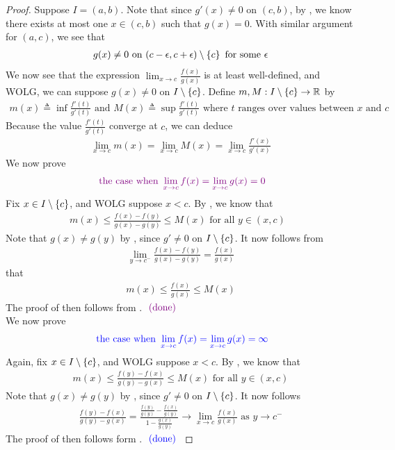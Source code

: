 \documentclass{report}
\begin{document}
\begin{proof}
Suppose $I=(a,b)$. Note that since $g'(x)\neq 0$ on $(c,b)$, by  , we know there exists at most one $x \in (c,b)$ such that $g(x)=0$. With similar argument for $(a,c)$, we see that 
\begin{align*}
g(x)\neq 0\text{ on }(c-\epsilon ,c+\epsilon )\setminus \left\{ c \right\}\text{ for some }\epsilon 
\end{align*}
We now see that the expression $\lim_{x\to c}\frac{f(x)}{g(x)}$ is at least well-defined, and WOLG, we can suppose $g(x)\neq 0$ on $I \setminus \left\{ c \right\}$. Define $m,M:I\setminus \left\{ c \right\}\rightarrow \mathbb{R}$ by 
\begin{align*}
m(x)\triangleq \inf \frac{f'(t)}{g'(t)}\text{ and }M(x)\triangleq \sup \frac{f'(t)}{g'(t)}\text{ where }t\text{ ranges over values between $x$ and  $c$ }
\end{align*}
Because the value $\frac{f'(t)}{g'(t)}$ converge at $c$, we can deduce
 \begin{align}
  \label{sq1}
\lim_{x\to c}m(x)=\lim_{x\to c}M(x)=\lim_{x\to c} \frac{f'(x)}{g'(x)}
\end{align}
We now prove  
\begin{align*}
  \textcolor{violet}{\text{ the case when }\lim_{x\to c}f(x)=\lim_{x\to c}g(x)=0}
\end{align*}
Fix $x \in I \setminus \left\{ c \right\}$, and WOLG suppose $x<c$. By , we know that 
\begin{align*}
m(x)\leq \frac{f(x)-f(y)}{g(x)-g(y)}\leq M(x)\text{ for all $y \in (x,c)$ }
\end{align*}
Note that $g(x)\neq g(y)$ by , since $g'\neq 0$ on $I \setminus \left\{ c \right\}$. It now follows from 
\begin{align*}
\lim_{y\to c^-} \frac{f(x)-f(y)}{g(x)-g(y)}= \frac{f(x)}{g(x)}
\end{align*}
that 
\begin{align*}
m(x)\leq \frac{f(x)}{g(x)}\leq M(x)
\end{align*}
The proof of  then follows from . $\textcolor{violet}{\text{ (done) }}$  \\


We now prove 
\begin{align*}
\textcolor{blue}{\text{ the case when }\lim_{x\to c}f(x)=\lim_{x\to c}g(x)=\infty}
\end{align*}
Again, fix $x \in I \setminus \left\{ c \right\}$, and WOLG suppose $x<c$. By  , we know that 
\begin{align*}
m(x)\leq \frac{f(y)-f(x)}{g(y)-g(x)}\leq M(x)\text{ for all }y \in (x,c)
\end{align*}
Note that $g(x)\neq g(y)$ by , since $g'\neq 0$ on $I \setminus \left\{ c \right\}$. It now follows 
\begin{align*}
\frac{f(y)-f(x)}{g(y)-g(x)}=\frac{\frac{f(y)}{g(y)} - \frac{f(x)}{g(y)}}{1- \frac{g(x)}{g(y)}}\to \lim_{x\to c} \frac{f(x)}{g(x)}\text{ as }y\to c^-
\end{align*}
The proof of  then follows form . $\textcolor{blue}{\text{ (done) }}$
\end{proof}
\end{document}
